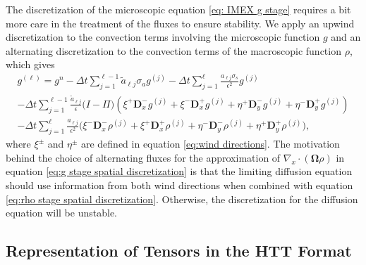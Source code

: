 \documentclass[onefignum,onetabnum]{siamart220329}
\begin{document}
The discretization of the microscopic equation \eqref{eq: IMEX g stage} requires a bit more care in the treatment of the fluxes to ensure stability. We apply an upwind discretization to the convection terms involving the microscopic function $g$ and an alternating discretization to the convection terms of the macroscopic function $\rho$, which gives
\begin{multline}
    g^{(\ell)} = g^{n} - \Delta t \sum_{j=1}^{\ell-1} \widetilde{a}_{\ell j} \sigma_{a} g^{(j)} - \Delta t \sum_{j=1}^{\ell} \frac{a_{\ell j}  \sigma_{s}}{\epsilon^{2}} g^{(j)} \\  - \Delta t \sum_{j=1}^{\ell-1} \frac{\widetilde{a}_{\ell j}}{\epsilon} \Big( I - \Pi \Big) \left( \xi^{+} \mathbf{D}_{x}^{-} g^{(j)} + \xi^{-} \mathbf{D}_{x}^{+} g^{(j)} + \eta^{+} \mathbf{D}_{y}^{-} g^{(j)} + \eta^{-} \mathbf{D}_{y}^{+} g^{(j)} \right) \\  
    -\Delta t \sum_{j=1}^{\ell} \frac{a_{\ell j}}{\epsilon^{2}} \Big( \xi^{-} \mathbf{D}_{x}^{-} \rho^{(j)} + \xi^{+} \mathbf{D}_{x}^{+} \rho^{(j)} + \eta^{-} \mathbf{D}_{y}^{-} \rho^{(j)} + \eta^{+} \mathbf{D}_{y}^{+} \rho^{(j)} \Big), \label{eq:g stage spatial discretization}
\end{multline}
where $\xi^{\pm}$ and $\eta^{\pm}$ are defined in equation \eqref{eq:wind directions}. The motivation behind the choice of alternating fluxes for the approximation of $\nabla_{x} \cdot \left( \mathbf{\Omega} \rho \right)$ in equation \eqref{eq:g stage spatial discretization} is that the limiting diffusion equation should use information from both wind directions when combined with equation \eqref{eq:rho stage spatial discretization}. Otherwise, the discretization for the diffusion equation will be unstable. 
    





\subsection{Representation of Tensors in the HTT Format}
\label{subsec:HTT}
\end{document}
